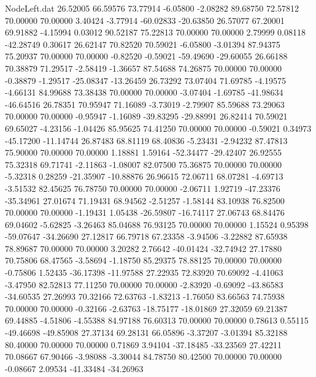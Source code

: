 \begin{filecontents}{NodeLeft.dat}
  26.52005   66.59576   73.77914    -6.05800   -2.08282   89.68750   72.57812   70.00000   70.00000    3.40424   -3.77914  -60.02833  -20.63850
  26.57077   67.20001   69.91882    -4.15994    0.03012   90.52187   75.22813   70.00000   70.00000    2.79999    0.08118  -42.28749    0.30617
  26.62147   70.82520   70.59021    -6.05800   -3.01394   87.94375   75.20937   70.00000   70.00000   -0.82520   -0.59021  -59.49690  -29.60055
  26.66188   70.38879   71.29517    -2.58419   -1.36657   87.54688   74.26875   70.00000   70.00000   -0.38879   -1.29517  -25.08347  -13.26459
  26.73292   73.07404   71.69785    -4.19575   -4.66131   84.99688   73.38438   70.00000   70.00000   -3.07404   -1.69785  -41.98634  -46.64516
  26.78351   70.95947   71.16089    -3.73019   -2.79907   85.59688   73.29063   70.00000   70.00000   -0.95947   -1.16089  -39.83295  -29.88991
  26.82414   70.59021   69.65027    -4.23156   -1.04426   85.95625   74.41250   70.00000   70.00000   -0.59021    0.34973  -45.17200  -11.14744
  26.87483   68.81119   68.40836    -5.23431   -2.94232   87.47813   75.90000   70.00000   70.00000    1.18881    1.59164  -52.34477  -29.42407
  26.92555   75.32318   69.71741    -2.11863   -1.08007   82.07500   75.36875   70.00000   70.00000   -5.32318    0.28259  -21.35907  -10.88876
  26.96615   72.06711   68.07281    -4.69713   -3.51532   82.45625   76.78750   70.00000   70.00000   -2.06711    1.92719  -47.23376  -35.34961
  27.01674   71.19431   68.94562    -2.51257   -1.58144   83.10938   76.82500   70.00000   70.00000   -1.19431    1.05438  -26.59807  -16.74117
  27.06743   68.84476   69.04602    -5.62825   -3.26463   85.04688   76.93125   70.00000   70.00000    1.15524    0.95398  -59.07647  -34.26690
  27.12817   66.79718   67.23358    -3.94506   -3.22882   87.65938   78.89687   70.00000   70.00000    3.20282    2.76642  -40.01424  -32.74942
  27.17880   70.75806   68.47565    -3.58694   -1.18750   85.29375   78.88125   70.00000   70.00000   -0.75806    1.52435  -36.17398  -11.97588
  27.22935   72.83920   70.69092    -4.41063   -3.47950   82.52813   77.11250   70.00000   70.00000   -2.83920   -0.69092  -43.86583  -34.60535
  27.26993   70.32166   72.63763    -1.83213   -1.76050   83.66563   74.75938   70.00000   70.00000   -0.32166   -2.63763  -18.75177  -18.01869
  27.32059   69.21387   69.44885    -4.51806   -4.55388   84.97188   76.60313   70.00000   70.00000    0.78613    0.55115  -49.46698  -49.85908
  27.37134   69.28131   66.05896    -3.37207   -3.01394   85.32188   80.40000   70.00000   70.00000    0.71869    3.94104  -37.18485  -33.23569
  27.42211   70.08667   67.90466    -3.98088   -3.30044   84.78750   80.42500   70.00000   70.00000   -0.08667    2.09534  -41.33484  -34.26963

\end{filecontents}

